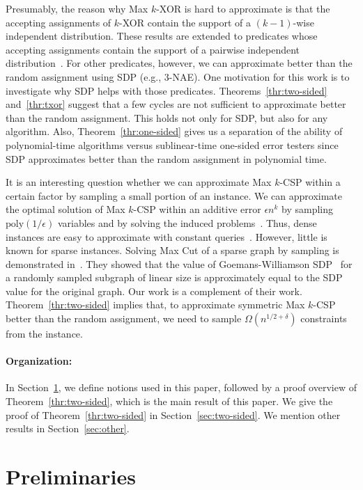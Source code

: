 \documentclass[letterpaper,11pt]{article}
\newcommand{\poly}{\mathrm{poly}}
\newcommand{\nae}{\textsf{NAE}\xspace}
\newcommand{\kxor}{$k$-\textsf{XOR}\xspace}
\newcommand{\maxcut}{\textsf{Max Cut}\xspace}
\newcommand{\maxkcsp}{\textsf{Max $k$-CSP}\xspace}
\newcommand{\maxkxor}{\textsf{Max $k$-XOR}\xspace}
\begin{document}
Presumably, the reason why \maxkxor is hard to approximate is that the accepting assignments of \kxor contain the support of a $(k-1)$-wise independent distribution.
These results are extended to predicates whose accepting assignments contain the support of a pairwise independent distribution~\cite{AM08, GMT09, Tul09}.
For other predicates, however, 
we can approximate better than the random assignment using SDP (e.g., $3$-\nae).
One motivation for this work is to investigate why SDP helps with those predicates.
Theorems~\ref{thr:two-sided} and~\ref{thr:txor} suggest that a few cycles are not sufficient to approximate better than the random assignment.
This holds not only for SDP,
but also for any algorithm.
Also, Theorem~\ref{thr:one-sided} gives us a separation of the ability of polynomial-time algorithms versus sublinear-time one-sided error testers since SDP approximates better than the random assignment in polynomial time.

It is an interesting question whether we can approximate \maxkcsp within a certain factor by sampling a small portion of an instance.
We can approximate the optimal solution of \maxkcsp within an additive error $\epsilon n^k$ by sampling $\poly(1/\epsilon)$ variables and by solving the induced problems~\cite{AdlVKK03}.
Thus, dense instances are easy to approximate with constant queries~\cite{AdlVKK03,AS02,AE02}.
However, little is known for sparse instances.
Solving \maxcut of a sparse graph by sampling is demonstrated in~\cite{BHHS09}.
They showed that the value of Goemans-Williamson SDP~\cite{GW95} for a randomly sampled subgraph of linear size is approximately equal to the SDP value for the original graph.
Our work is a complement of their work.
Theorem~\ref{thr:two-sided} implies that, 
to approximate symmetric \maxkcsp better than the random assignment,
we need to sample $\Omega(n^{1/2+\delta})$ constraints from the instance.

\paragraph{Organization:}
In Section~\ref{sec:preliminary}, 
we define notions used in this paper,
followed by a proof overview of Theorem~\ref{thr:two-sided}, 
which is the main result of this paper.
We give the proof of Theorem~\ref{thr:two-sided} in Section~\ref{sec:two-sided}.
We mention other results in Section~\ref{sec:other}.

\section{Preliminaries}\label{sec:preliminary}
\end{document}

